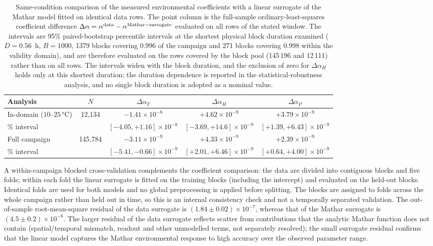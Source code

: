 \documentclass[aps,prapplied,reprint,superscriptaddress]{revtex4-2}
\begin{document}
\begin{table}[tbp]
\centering
\caption{Same-condition comparison of the measured environmental coefficients with a linear surrogate of the Mathar model fitted on identical data rows. The point column is the full-sample ordinary-least-squares coefficient difference $\Delta\alpha = \alpha^{\rm data} - \alpha^{\rm Mathar-surrogate}$ evaluated on all rows of the stated window. The intervals are 95\% paired-bootstrap percentile intervals at the shortest physical block duration examined ($D = 0.56$~h, $B = 1000$, 1379 blocks covering 0.996 of the campaign and \num{271} blocks covering 0.998 within the validity domain), and are therefore evaluated on the rows covered by the block pool (145\,196 and 12\,111) rather than on all rows. The intervals widen with the block duration, and the exclusion of zero for $\Delta\alpha_H$ holds only at this shortest duration; the duration dependence is reported in the statistical-robustness analysis, and no single block duration is adopted as a nominal value.}
\label{tab:S2}
\begin{tabular}{lcccc}
\hline
Analysis & $N$ & $\Delta\alpha_T$ & $\Delta\alpha_H$ & $\Delta\alpha_P$ \\
\hline
In-domain ($10$--$25\,\si{\degreeCelsius}$) & 12,134 & $-1.41\times 10^{-8}$ & $+4.62\times 10^{-9}$ & $+3.79\times 10^{-9}$ \\
\quad 95\% interval & & $[-4.05, +1.16]\times 10^{-8}$ & $[-3.69, +14.6]\times 10^{-9}$ & $[+1.39, +6.43]\times 10^{-9}$ \\
Full campaign  & 145,784 & $-3.11\times 10^{-9}$ & $+4.33\times 10^{-9}$ & $+2.39\times 10^{-9}$ \\
\quad 95\% interval & & $[-5.41, -0.66]\times 10^{-9}$ & $[+2.01, +6.46]\times 10^{-9}$ & $[+0.64, +4.00]\times 10^{-9}$ \\
\hline
\end{tabular}
\end{table}

A within-campaign blocked cross-validation complements the coefficient comparison: the data are divided into contiguous blocks and five folds; within each fold the linear surrogate is fitted on the training blocks (including the intercept) and evaluated on the held-out blocks. Identical folds are used for both models and no global preprocessing is applied before splitting. The blocks are assigned to folds across the whole campaign rather than held out in time, so this is an internal consistency check and not a temporally separated validation. The out-of-sample root-mean-square residual of the data surrogate is $(1.84 \pm 0.02) \times 10^{-7}$, whereas that of the Mathar surrogate is $(4.5 \pm 0.2) \times 10^{-8}$. The larger residual of the data surrogate reflects scatter from contributions that the analytic Mathar function does not contain (spatial/temporal mismatch, readout and other unmodelled terms, not separately resolved); the small surrogate residual confirms that the linear model captures the Mathar environmental response to high accuracy over the observed parameter range.
\end{document}
